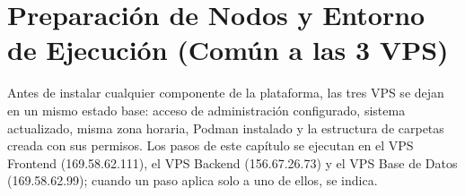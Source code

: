 \section{Preparación de Nodos y Entorno de Ejecución (Común a las 3 VPS)}\label{cap:02_preparacion_nodos}
Antes de instalar cualquier componente de la plataforma, las tres VPS se dejan en un mismo estado base: acceso de administración configurado, sistema actualizado, misma zona horaria, Podman instalado y la estructura de carpetas creada con sus permisos. Los pasos de este capítulo se ejecutan en el VPS Frontend (169.58.62.111), el VPS Backend (156.67.26.73) y el VPS Base de Datos (169.58.62.99); cuando un paso aplica solo a uno de ellos, se indica.




